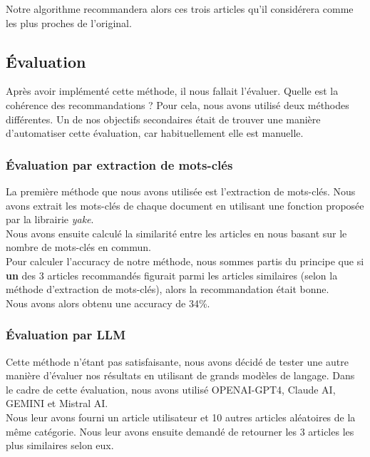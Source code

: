 \documentclass[a4paper,12pt]{article}
\begin{document}
Notre algorithme recommandera alors ces trois articles qu'il considérera comme les plus proches de l'original.

\subsection{Évaluation}

Après avoir implémenté cette méthode, il nous fallait l'évaluer. Quelle est la cohérence des recommandations ? Pour cela, nous avons utilisé deux méthodes différentes. Un de nos objectifs secondaires était de trouver une manière d'automatiser cette évaluation, car habituellement elle est manuelle.

\subsubsection{Évaluation par extraction de mots-clés}

La première méthode que nous avons utilisée est l'extraction de mots-clés. Nous avons extrait les mots-clés de chaque document en utilisant une fonction proposée par la librairie \textit{yake}.\\

Nous avons ensuite calculé la similarité entre les articles en nous basant sur le nombre de mots-clés en commun.\\

Pour calculer l'accuracy de notre méthode, nous sommes partis du principe que si \textbf{un} des 3 articles recommandés figurait parmi les articles similaires (selon la méthode d'extraction de mots-clés), alors la recommandation était bonne.\\

Nous avons alors obtenu une accuracy de 34\%.

\subsubsection{Évaluation par LLM}

Cette méthode n'étant pas satisfaisante, nous avons décidé de tester une autre manière d'évaluer nos résultats en utilisant de grands modèles de langage. Dans le cadre de cette évaluation, nous avons utilisé OPENAI-GPT4, Claude AI, GEMINI et Mistral AI.\\

Nous leur avons fourni un article utilisateur et 10 autres articles aléatoires de la même catégorie. Nous leur avons ensuite demandé de retourner les 3 articles les plus similaires selon eux.\\
\end{document}
